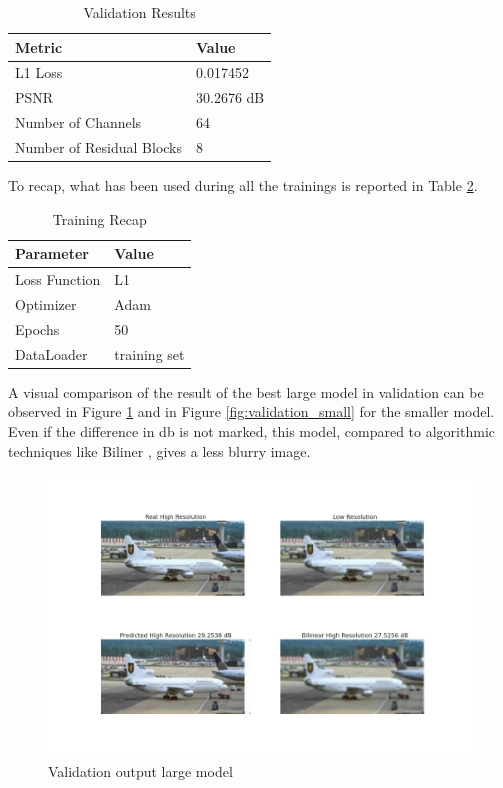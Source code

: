 \documentclass[../report.tex]{subfiles}
\begin{document}
\begin{table}[]
	\centering
	\caption{Validation Results}
	\begin{tabular}{@{}ll@{}}
		\toprule
		\textbf{Metric}            & \textbf{Value} \\ \midrule
		L1 Loss                    & 0.017452 \\ 
		PSNR                       & 30.2676 dB \\ 
		Number of Channels         & 64 \\ 
		Number of Residual Blocks  & 8 \\ 
		\bottomrule
	\end{tabular}
	\label{tab:validation_results}
\end{table}
To recap, what has been used during all the trainings is reported in Table \ref{tab:training_recap}.
\begin{table}[]
	\centering
	\caption{Training Recap}
	\begin{tabular}{@{}ll@{}}
		\toprule
		\textbf{Parameter}       & \textbf{Value} \\ \midrule
		Loss Function            & L1 \\ 
		Optimizer                & Adam \\ 
		Epochs                   & 50 \\ 
		DataLoader      & training set\\
		\bottomrule
	\end{tabular}
	\label{tab:training_recap}
\end{table}
A visual comparison of the result of the best large model in validation can be observed in Figure \ref{fig:validation} and in Figure \ref{fig:validation_small} for the smaller model. Even if the difference in db is not marked, this model, compared to algorithmic techniques like Biliner , gives a less blurry image. 

\begin{figure}[H]
	\caption{Validation output large model}
	\centering
	\label{fig:validation}
	\includegraphics[width=\textwidth]{../images/validation_prediction_comparison_large_model.jpg}
\end{figure}
\end{document}
